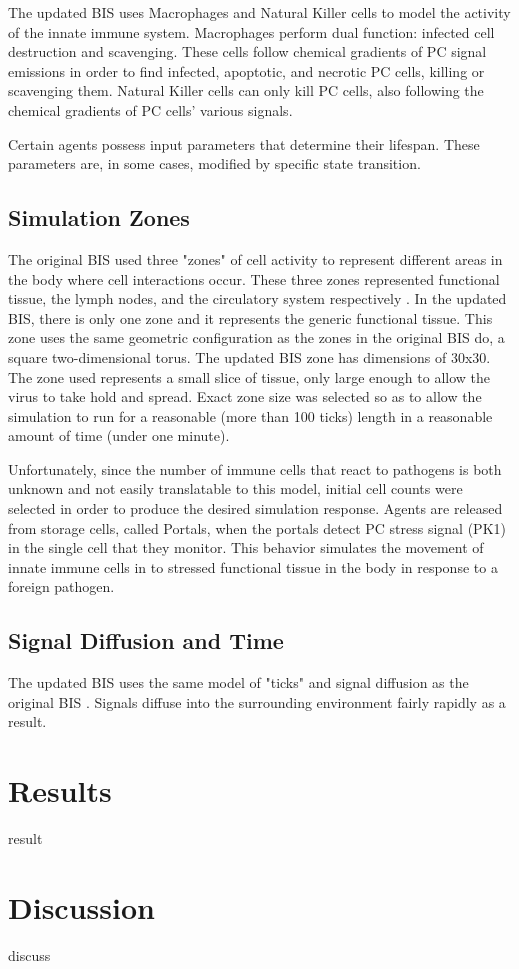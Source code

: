 \documentclass[10pt,conference]{IEEEtran}
\begin{document}
\indent
The updated BIS uses Macrophages and Natural Killer cells to model the activity of the innate immune system. Macrophages perform dual
function: infected cell destruction and scavenging. These cells follow chemical gradients of PC signal emissions in order to find infected,
apoptotic, and necrotic PC cells, killing or scavenging them. Natural Killer cells can only kill PC cells, also following the chemical gradients of
PC cells' various signals.

\indent
Certain agents possess input parameters that determine their lifespan. These parameters are, in some cases, modified by specific state
transition.

\subsection{Simulation Zones}
The original BIS used three "zones" of cell activity to represent different areas in the body where cell interactions occur. These three zones
represented functional tissue, the lymph nodes, and the circulatory system respectively \cite{Folcik:2007}. In the updated BIS, there is only
one zone and it represents the generic functional tissue. This zone uses the same geometric configuration as the zones in the original BIS do,
a square two-dimensional torus. The updated BIS zone has dimensions of 30x30. The zone used represents a small slice of tissue, only large
enough to allow the virus to take hold and spread. Exact zone size was selected so as to allow the simulation to run for a reasonable (more than 100
ticks) length in a reasonable amount of time (under one minute).

\indent
Unfortunately, since the number of immune cells that react to pathogens is both unknown and not easily translatable to this model, initial cell
counts were selected in order to produce the desired simulation response. Agents are released from storage cells, called Portals, when the
portals detect PC stress signal (PK1) in the single cell that they monitor. This behavior simulates the movement of innate immune cells in
to stressed functional tissue in the body in response to a foreign pathogen.

\subsection{Signal Diffusion and Time}
The updated BIS uses the same model of "ticks" and signal diffusion as the original BIS \cite{Folcik:2007}. Signals diffuse into the surrounding environment fairly rapidly as a result.


\noindent

\section{Results}
\noindent
result

\section{Discussion}
\noindent
discuss



\end{document}
